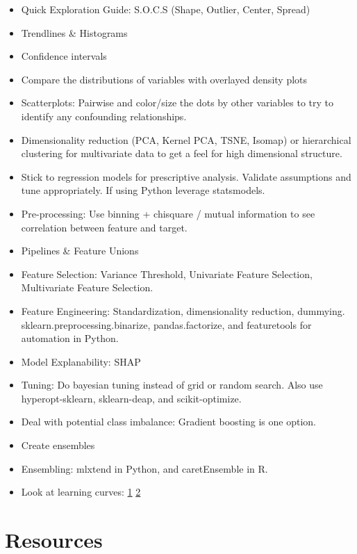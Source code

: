 \documentclass[]{book}
\begin{document}
\begin{itemize}
\item
  Quick Exploration Guide: S.O.C.S (Shape, Outlier, Center, Spread)
\item
  Trendlines \& Histograms
\item
  Confidence intervals
\item
  Compare the distributions of variables with overlayed density plots
\item
  Scatterplots: Pairwise and color/size the dots by other variables to try to identify any confounding relationships.
\item
  Dimensionality reduction (PCA, Kernel PCA, TSNE, Isomap) or hierarchical clustering for multivariate data to get a feel for high dimensional structure.
\item
  Stick to regression models for prescriptive analysis. Validate assumptions and tune appropriately. If using Python leverage statsmodels.
\item
  Pre-processing: Use binning + chisquare / mutual information to see correlation between feature and target.
\item
  Pipelines \& Feature Unions
\item
  Feature Selection: Variance Threshold, Univariate Feature Selection, Multivariate Feature Selection.
\item
  Feature Engineering: Standardization, dimensionality reduction, dummying. sklearn.preprocessing.binarize, pandas.factorize, and featuretools for automation in Python.
\item
  Model Explanability: SHAP
\item
  Tuning: Do bayesian tuning instead of grid or random search. Also use hyperopt-sklearn, sklearn-deap, and scikit-optimize.
\item
  Deal with potential class imbalance: Gradient boosting is one option.
\item
  Create ensembles
\item
  Ensembling: mlxtend in Python, and caretEnsemble in R.
\item
  Look at learning curves: \href{https://www.dataquest.io/blog/learning-curves-machine-learning/}{1} \textbar{} \href{http://www.scikit-yb.org/en/latest/api/model_selection/learning_curve.html}{2}
\end{itemize}

\hypertarget{resources}{%
\section{Resources}\label{resources}}
\end{document}
